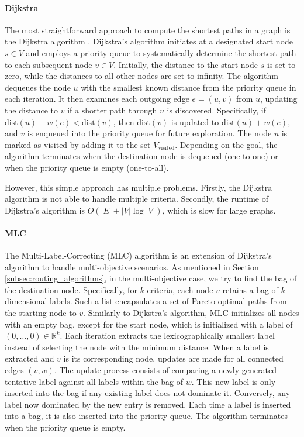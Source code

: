 \paragraph{Dijkstra}
\label{subsubsec:dijkstra}
The most straightforward approach to compute the shortest paths in a graph is the Dijkstra algorithm .
Dijkstra's algorithm initiates at a designated start node \( s \in V \) and employs a priority queue to systematically determine the shortest path to each subsequent node \( v \in V \).
Initially, the distance to the start node \( s \) is set to zero, while the distances to all other nodes are set to infinity.
The algorithm dequeues the node \( u \) with the smallest known distance from the priority queue in each iteration.
It then examines each outgoing edge \( e = (u, v) \) from \( u \), updating the distance to \( v \) if a shorter path through \( u \) is discovered.
Specifically, if \( \text{dist}(u) + w(e) < \text{dist}(v) \), then \( \text{dist}(v) \) is updated to \( \text{dist}(u) + w(e) \), and \( v \) is enqueued into the priority queue for future exploration.
The node \( u \) is marked as visited by adding it to the set \( V_{\text{visited}} \).
Depending on the goal, the algorithm terminates when the destination node is dequeued (one-to-one) or when the priority queue is empty (one-to-all).


However, this simple approach has multiple problems.
Firstly, the Dijkstra algorithm is not able to handle multiple criteria.
Secondly, the runtime of Dijkstra's algorithm is \( O(|E| + |V| \log |V|) \), which is slow for large graphs.

\paragraph{MLC}
\label{subsubsec:mlc}

The Multi-Label-Correcting (MLC)  algorithm is an extension of Dijkstra's algorithm to handle multi-objective scenarios.
As mentioned in Section \ref{subsec:routing_algorithms}, in the multi-objective case, we try to find the bag of the destination node.
Specifically, for \(k\) criteria, each node \(v\) retains a bag of \(k\)-dimensional labels. Such a list encapsulates a set of Pareto-optimal paths from the starting node to \(v\).
Similarly to Dijkstra's algorithm, MLC initializes all nodes with an empty bag, except for the start node, which is initialized with a label of \( (0, \dots, 0) \in \mathbb{R}^k \).
Each iteration extracts the lexicographically smallest label instead of selecting the node with the minimum distance.
When a label is extracted and \(v\) is its corresponding node, updates are made for all connected edges \( (v, w) \).
The update process consists of comparing a newly generated tentative label against all labels within the bag of \(w\).
This new label is only inserted into the bag if any existing label does not dominate it.
Conversely, any label now dominated by the new entry is removed.
Each time a label is inserted into a bag, it is also inserted into the priority queue.
The algorithm terminates when the priority queue is empty.

